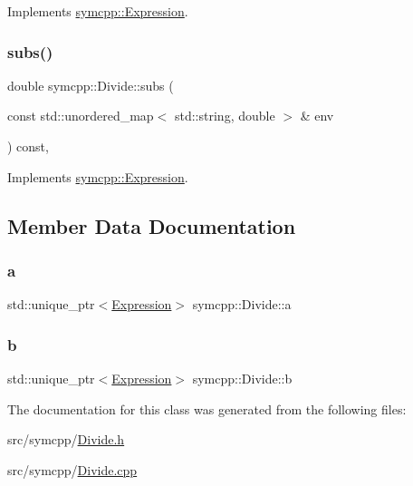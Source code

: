 Implements \mbox{\hyperlink{classsymcpp_1_1Expression_ab1fa6e55eea0682250d013f28db26cd2}{symcpp\+::\+Expression}}.

\mbox{\label{classsymcpp_1_1Divide_a85dcd571e1d2a188dcdc8090b7e90074}} 
\subsubsection{\texorpdfstring{subs()}{subs()}}
{\footnotesize\ttfamily double symcpp\+::\+Divide\+::subs (\begin{DoxyParamCaption}\item[{const std\+::unordered\+\_\+map$<$ std\+::string, double $>$ \&}]{env }\end{DoxyParamCaption}) const\hspace{0.3cm}{\ttfamily [override]}, {\ttfamily [virtual]}}



Implements \mbox{\hyperlink{classsymcpp_1_1Expression_aaef29b0afa2d6c21fe35f47a1be76134}{symcpp\+::\+Expression}}.



\subsection{Member Data Documentation}
\mbox{\label{classsymcpp_1_1Divide_a52eaf8a705da4ef10b1fa2b87e76d0d8}} 
\subsubsection{\texorpdfstring{a}{a}}
{\footnotesize\ttfamily std\+::unique\+\_\+ptr$<$\mbox{\hyperlink{classsymcpp_1_1Expression}{Expression}}$>$ symcpp\+::\+Divide\+::a\hspace{0.3cm}{\ttfamily [private]}}

\mbox{\label{classsymcpp_1_1Divide_a122c034c19635c036d39fbf18b1b8348}} 
\subsubsection{\texorpdfstring{b}{b}}
{\footnotesize\ttfamily std\+::unique\+\_\+ptr$<$\mbox{\hyperlink{classsymcpp_1_1Expression}{Expression}}$>$ symcpp\+::\+Divide\+::b\hspace{0.3cm}{\ttfamily [private]}}



The documentation for this class was generated from the following files\+:\begin{DoxyCompactItemize}
\item 
src/symcpp/\mbox{\hyperlink{Divide_8h}{Divide.\+h}}\item 
src/symcpp/\mbox{\hyperlink{Divide_8cpp}{Divide.\+cpp}}\end{DoxyCompactItemize}
